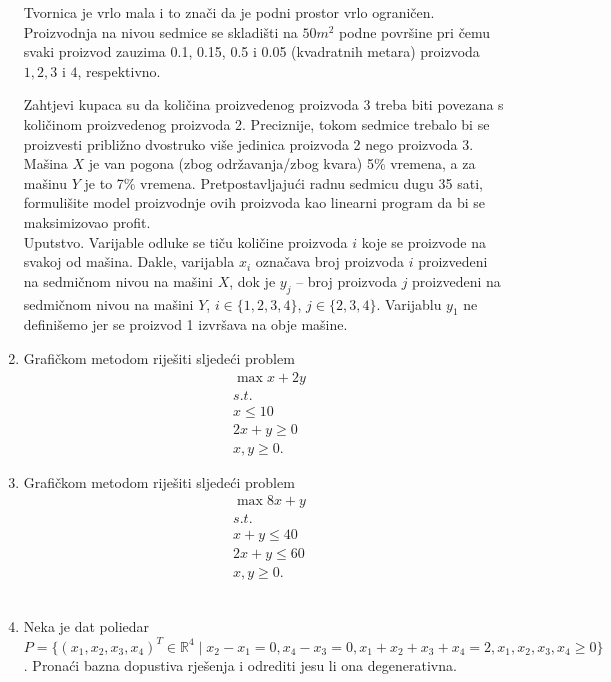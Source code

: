 \documentclass[a4paper, utf8, 11pt, colorlinks]{book}
\begin{document}
\begin{enumerate}
Tvornica je vrlo mala i to znači da je podni prostor vrlo ograničen. Proizvodnja na nivou sedmice se skladišti na $50 m^2$ podne površine pri čemu svaki proizvod zauzima 0.1, 0.15, 0.5 i 0.05 (kvadratnih metara) proizvoda $1, 2, 3$ i $4$,  respektivno. 

Zahtjevi kupaca su da količina proizvedenog proizvoda 3 treba biti povezana s količinom proizvedenog proizvoda 2. Preciznije, tokom sedmice trebalo bi se proizvesti približno dvostruko više jedinica proizvoda 2 nego proizvoda 3. Mašina $X$ je van pogona (zbog održavanja/zbog kvara) 5\% vremena, a za mašinu $Y$ je to 7\% vremena.
Pretpostavljajući radnu sedmicu dugu 35 sati, formulišite model proizvodnje ovih proizvoda kao linearni program da bi se maksimizovao profit. \\

Uputstvo. Varijable odluke se tiču količine proizvoda $i$ koje se proizvode na svakoj od mašina.  Dakle, 
varijabla $x_i$ označava broj proizvoda $i$ proizvedeni na sedmičnom nivou na mašini $X$, dok je $y_j$ --   broj proizvoda $j$ proizvedeni na sedmičnom nivou na mašini $Y$, $i \in \{1,2,3,4\}$, $j \in \{2,3,4\}$. Varijablu $y_1$ ne definišemo jer se proizvod 1 izvršava na obje mašine.  

	\item Grafičkom metodom riješiti sljedeći problem
	\begin{align*}
		&\max   x + 2 y \\
		& s.t. \\
		& x \leq 10 \\
		& 2 x + y\geq 0 \\
		& x,y \geq 0.
	\end{align*}
	\item Grafičkom metodom riješiti sljedeći problem 
	\begin{align*}
		& \max  8 x + y \\
		& s.t. \\
		&  x + y \leq 40 \\
		& 2x + y \leq 60 \\
		& x,y \geq 0.
	\end{align*}
\\

\item Neka je dat poliedar $P= \{ (x_1,x_2,x_3, x_4)^T \in \mathbb{R}^4 \mid x_2 - x_1 = 0, x_4 - x_3 = 0,  x_1 + x_2 +   x_3 + x_4 = 2, x_1,x_2,x_3, x_4 \geq 0 \}$.  Pronaći bazna dopustiva rješenja i odrediti jesu li ona degenerativna.  
  
\end{enumerate}
\end{document}
